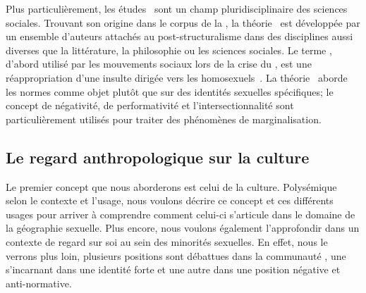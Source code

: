 Plus particulièrement, les études \qus\ sont un champ pluridisciplinaire des sciences sociales. 
Trouvant son origine dans le corpus de la , la théorie \qu\ est développée par un ensemble d'auteurs attachés au post-structuralisme dans des disciplines aussi diverses que la littérature, la philosophie ou les sciences sociales. 
Le terme \qu, d'abord utilisé par les mouvements sociaux \lgbt{} lors de la crise du \sida, est une réappropriation d'une insulte dirigée vers les homosexuels~\citep{Laprade2014}.
La théorie \qu\ aborde les normes  comme objet plutôt que sur des identités sexuelles spécifiques; le concept de négativité, de performativité et l'intersectionnalité sont particulièrement utilisés pour traiter des phénomènes de marginalisation.

\subsection{Le regard anthropologique sur la culture}
\label{subsec:le_regard_anthropologique_sur_la_culture} 
Le premier concept que nous aborderons est celui de la culture. 
Polysémique selon le contexte et l'usage, nous voulons décrire ce concept et ces différents usages pour arriver à comprendre comment celui-ci s'articule dans le domaine de la géographie sexuelle.
Plus encore, nous voulons également l'approfondir dans un contexte de regard sur soi au sein des minorités sexuelles. 
En effet, nous le verrons plus loin, plusieurs positions sont débattues dans la communauté \lgbt{}, une s'incarnant dans une identité forte et une autre dans une position négative et anti-normative.


